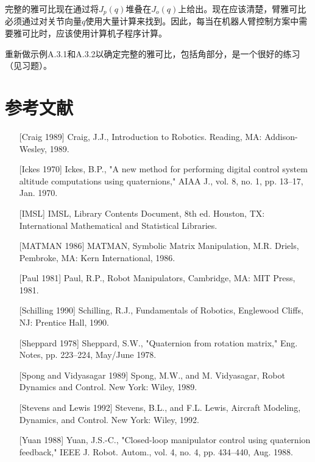 \documentclass[UTF8,a4paper]{ctexart}
\begin{document}
完整的雅可比现在通过将$J_p(q)$堆叠在$J_o(q)$上给出。现在应该清楚，臂雅可比必须通过对关节向量$q$使用大量计算来找到。因此，每当在机器人臂控制方案中需要雅可比时，应该使用计算机子程序计算。

重新做示例A.3.1和A.3.2以确定完整的雅可比，包括角部分，是一个很好的练习（见习题）。

\section*{参考文献}

\begin{enumerate}
    \item[{[Craig 1989]}] Craig, J.J., Introduction to Robotics. Reading, MA: Addison-Wesley, 1989.
    
    \item[{[Ickes 1970]}] Ickes, B.P., "A new method for performing digital control system altitude computations using quaternions," AIAA J., vol. 8, no. 1, pp. 13--17, Jan. 1970.
    
    \item[{[IMSL]}] IMSL, Library Contents Document, 8th ed. Houston, TX: International Mathematical and Statistical Libraries.
    
    \item[{[MATMAN 1986]}] MATMAN, Symbolic Matrix Manipulation, M.R. Driels, Pembroke, MA: Kern International, 1986.
    
    \item[{[Paul 1981]}] Paul, R.P., Robot Manipulators, Cambridge, MA: MIT Press, 1981.
    
    \item[{[Schilling 1990]}] Schilling, R.J., Fundamentals of Robotics, Englewood Cliffs, NJ: Prentice Hall, 1990.
    
    \item[{[Sheppard 1978]}] Sheppard, S.W., "Quaternion from rotation matrix," Eng. Notes, pp. 223--224, May/June 1978.
    
    \item[{[Spong and Vidyasagar 1989]}] Spong, M.W., and M. Vidyasagar, Robot Dynamics and Control. New York: Wiley, 1989.
    
    \item[{[Stevens and Lewis 1992]}] Stevens, B.L., and F.L. Lewis, Aircraft Modeling, Dynamics, and Control. New York: Wiley, 1992.
    
    \item[{[Yuan 1988]}] Yuan, J.S.-C., "Closed-loop manipulator control using quaternion feedback," IEEE J. Robot. Autom., vol. 4, no. 4, pp. 434--440, Aug. 1988.
\end{enumerate}
\end{document}
